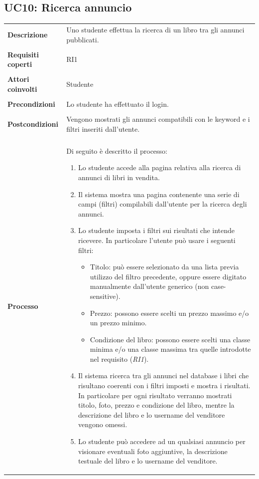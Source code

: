 \documentclass[10pt,a4paper]{article}
\begin{document}
	\subsection{UC10: Ricerca annuncio}
	\begin{tabular}{lp{}}
		\textbf{Descrizione}&Uno studente effettua la ricerca di un libro tra gli annunci pubblicati.\\
		\\
		\textbf{Requisiti coperti}&RI1\\
		\\
		\textbf{Attori coinvolti}&Studente\\
		\\
		\textbf{Precondizioni}&Lo studente ha effettuato il login.\\
		\\
		\textbf{Postcondizioni}&Vengono mostrati gli annunci compatibili con le keyword e i filtri inseriti dall'utente.\\
		\\
		\textbf{Processo}&Di seguito è descritto il processo:
		\begin{enumerate}
			\item Lo studente accede alla pagina relativa alla ricerca di annunci di libri in vendita.
			\item Il sistema mostra una pagina contenente una serie di campi (filtri) compilabili dall'utente per la ricerca degli annunci.
			\item Lo studente imposta i filtri sui risultati che intende ricevere. In particolare l'utente può usare i seguenti filtri:
			\begin{itemize}
				\item Titolo: può essere selezionato da una lista previa utilizzo del filtro precedente, oppure essere digitato manualmente dall'utente generico (non case-sensitive).
				\item Prezzo: possono essere scelti un prezzo massimo e/o un prezzo minimo.
				\item Condizione del libro: possono essere scelti una classe minima e/o una classe massima tra quelle introdotte nel requisito (\textit{RI1}).			
			\end{itemize}
			\item Il sistema ricerca tra gli annunci nel database i libri che risultano coerenti con i filtri imposti e mostra i risultati. In particolare per ogni risultato verranno mostrati titolo, foto, prezzo e condizione del libro, mentre la descrizione del libro e lo username del venditore vengono omessi.
			\item Lo studente può accedere ad un qualsiasi annuncio per visionare eventuali foto aggiuntive, la descrizione testuale del libro e lo username del venditore.
		\end{enumerate}
	\end{tabular}
	
\end{document}
